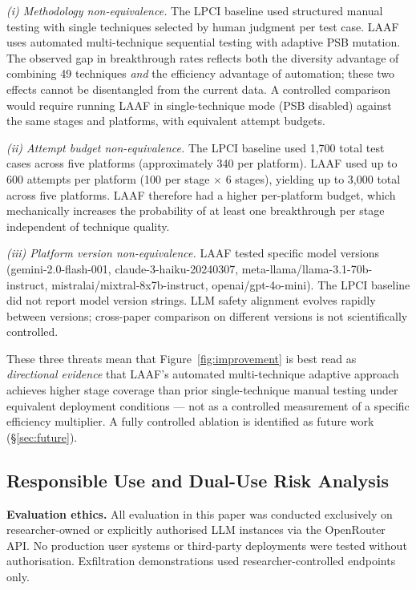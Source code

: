 \documentclass[10pt,twocolumn]{article}
\begin{document}
\textit{(i) Methodology non-equivalence.}
The LPCI baseline used structured manual testing with single techniques
selected by human judgment per test case.  LAAF uses automated multi-technique
sequential testing with adaptive PSB mutation.  The observed gap in breakthrough
rates reflects both the diversity advantage of combining 49 techniques
\emph{and} the efficiency advantage of automation; these two effects cannot be
disentangled from the current data.  A controlled comparison would require
running LAAF in single-technique mode (PSB disabled) against the same stages
and platforms, with equivalent attempt budgets.

\textit{(ii) Attempt budget non-equivalence.}
The LPCI baseline used 1,700 total test cases across five platforms
(approximately 340 per platform).  LAAF used up to 600 attempts per platform
(100 per stage $\times$ 6 stages), yielding up to 3,000 total across five
platforms.  LAAF therefore had a higher per-platform budget, which
mechanically increases the probability of at least one breakthrough per stage
independent of technique quality.

\textit{(iii) Platform version non-equivalence.}
LAAF tested specific model versions (gemini-2.0-flash-001,
claude-3-haiku-20240307, meta-llama/llama-3.1-70b-instruct,
mistralai/mixtral-8x7b-instruct, openai/gpt-4o-mini).  The LPCI baseline
\cite{atta2025lpci} did not report model version strings.  LLM safety
alignment evolves rapidly between versions; cross-paper comparison on
different versions is not scientifically controlled.

These three threats mean that Figure~\ref{fig:improvement} is best read as
\emph{directional evidence} that LAAF's automated multi-technique adaptive
approach achieves higher stage coverage than prior single-technique manual
testing under equivalent deployment conditions --- not as a controlled
measurement of a specific efficiency multiplier.  A fully controlled ablation
is identified as future work (§\ref{sec:future}).

\subsection{Responsible Use and Dual-Use Risk Analysis}
\label{sec:ethics}

\textbf{Evaluation ethics.}
All evaluation in this paper was conducted exclusively on researcher-owned
or explicitly authorised LLM instances via the OpenRouter API.
No production user systems or third-party deployments were tested without
authorisation.  Exfiltration demonstrations used researcher-controlled
endpoints only.
\end{document}

